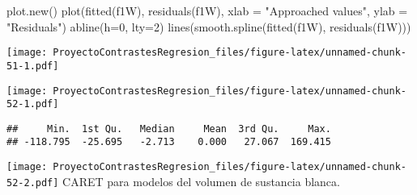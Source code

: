 \documentclass[
]{article}
\newenvironment{Shaded}{\begin{snugshade}}{\end{snugshade}}
\newcommand{\AttributeTok}[1]{\textcolor[rgb]{0.77,0.63,0.00}{#1}}
\newcommand{\DecValTok}[1]{\textcolor[rgb]{0.00,0.00,0.81}{#1}}
\newcommand{\FunctionTok}[1]{\textcolor[rgb]{0.00,0.00,0.00}{#1}}
\newcommand{\NormalTok}[1]{#1}
\newcommand{\SpecialCharTok}[1]{\textcolor[rgb]{0.00,0.00,0.00}{#1}}
\newcommand{\StringTok}[1]{\textcolor[rgb]{0.31,0.60,0.02}{#1}}
\begin{document}
\begin{Shaded}
\begin{Highlighting}[]
\FunctionTok{plot.new}\NormalTok{()}
\FunctionTok{plot}\NormalTok{(}\FunctionTok{fitted}\NormalTok{(f1W), }\FunctionTok{residuals}\NormalTok{(f1W), }\AttributeTok{xlab =} \StringTok{"Approached values"}\NormalTok{,  }\AttributeTok{ylab =} \StringTok{"Residuals"}\NormalTok{)}
  \FunctionTok{abline}\NormalTok{(}\AttributeTok{h=}\DecValTok{0}\NormalTok{, }\AttributeTok{lty=}\DecValTok{2}\NormalTok{)}
    \FunctionTok{lines}\NormalTok{(}\FunctionTok{smooth.spline}\NormalTok{(}\FunctionTok{fitted}\NormalTok{(f1W), }\FunctionTok{residuals}\NormalTok{(f1W)))}
\end{Highlighting}
\end{Shaded}

\texttt{[image: ProyectoContrastesRegresion\_files/figure-latex/unnamed-chunk-51-1.pdf]}

\begin{Shaded}
\end{Shaded}

\texttt{[image: ProyectoContrastesRegresion\_files/figure-latex/unnamed-chunk-52-1.pdf]}

\begin{Shaded}
\end{Shaded}

\begin{verbatim}
##     Min.  1st Qu.   Median     Mean  3rd Qu.     Max. 
## -118.795  -25.695   -2.713    0.000   27.067  169.415
\end{verbatim}

\begin{Shaded}
\end{Shaded}

\texttt{[image: ProyectoContrastesRegresion\_files/figure-latex/unnamed-chunk-52-2.pdf]}
CARET para modelos del volumen de sustancia blanca.
\end{document}
